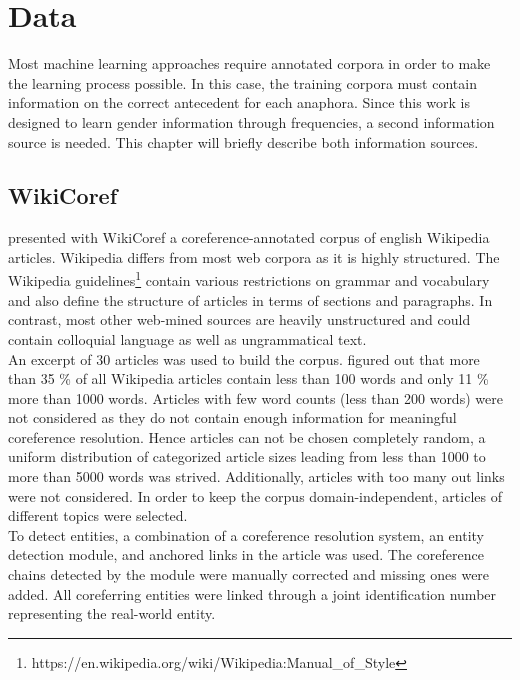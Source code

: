 \chapter{Data}
\label{sec:Data}

Most machine learning approaches require annotated corpora in order to make the learning process possible. In this case, the training corpora must contain information on the correct antecedent for each anaphora. Since this work is designed to learn gender information through frequencies, a second information source is needed. This chapter will briefly describe both information sources.

\section{WikiCoref }
\label{wikicorefSec}
\cite{wikicoref2016} presented with WikiCoref a coreference-annotated corpus of english Wikipedia articles. Wikipedia differs from most web corpora as it is highly structured. The Wikipedia guidelines\footnote{https://en.wikipedia.org/wiki/Wikipedia:Manual\_of\_Style} contain various restrictions on grammar and vocabulary and also define the structure of articles in terms of sections and paragraphs. In contrast, most other web-mined sources are heavily unstructured and could contain colloquial language as well as ungrammatical text. \\
An excerpt of 30 articles was used to build the corpus. \citep{wikicoref2016} figured out that more than 35 \% of all Wikipedia articles contain less than 100 words and only 11 \% more than 1000 words. Articles with few word counts (less than 200 words) were not considered as they do not contain enough information for meaningful coreference resolution. Hence articles can not be chosen completely random, a uniform distribution of categorized article sizes leading from less than 1000 to more than 5000 words was strived. Additionally, articles with too many out links were not considered. In order to keep the corpus domain-independent, articles of different topics were selected.\\

To detect entities, a combination of a coreference resolution system, an entity detection module, and anchored links in the article was used. The coreference chains detected by the module were manually corrected and missing ones were added. All coreferring entities were linked through a joint identification number representing the real-world entity.

